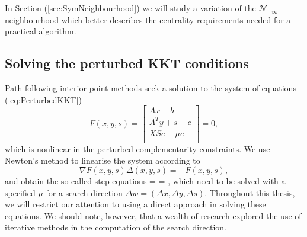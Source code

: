 In Section (\ref{sec:SymNeighbourhood}) we will study a variation
of the $\mathcal{N}_{-\infty}$ neighbourhood which better describes
the centrality requirements needed for a practical algorithm.


%
%
\subsection{Solving the perturbed KKT conditions}

Path-following interior point methods seek a solution 
to the system of equations (\ref{eq:PerturbedKKT})
\[
F(x,y,s) = \left[
  \begin{array}{c}
    Ax-b \\
    A^Ty+s-c \\
    XSe - \mu e \\
  \end{array} \right] = 0,
\]
which is nonlinear in the perturbed complementarity constraints.
We use Newton's method to linearise the system according to
\[
\nabla F(x,y,s) \Delta(x,y,s) = -F(x,y,s),
\]
and obtain the so-called step equations
%
\be \label{eq:NewtonSystem}
 =
 =
\left[ \begin{array}{c}
    \xi_b \\ \xi_c \\ \xi_\mu
   \end{array} \right],
\ee
%
which need to be solved with a specified $\mu$ for a search direction
$\Delta w = (\Delta x, \Delta y, \Delta s)$. Throughout this thesis, we will 
restrict our attention to using a direct approach in solving these
equations.
We should note, however, that a wealth of research explored the use
of iterative methods in the computation of the search direction.

